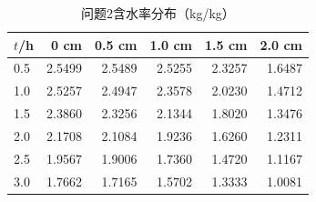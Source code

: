 \begin{table}[!htbp]\centering
\caption{问题2含水率分布（kg/kg）}
\begin{tabular}{lrrrrr}\toprule
$t$/h & 0 cm & 0.5 cm & 1.0 cm & 1.5 cm & 2.0 cm\\\midrule
0.5 & 2.5499 & 2.5489 & 2.5255 & 2.3257 & 1.6487\\
1.0 & 2.5257 & 2.4947 & 2.3578 & 2.0230 & 1.4712\\
1.5 & 2.3860 & 2.3256 & 2.1344 & 1.8020 & 1.3476\\
2.0 & 2.1708 & 2.1084 & 1.9236 & 1.6260 & 1.2311\\
2.5 & 1.9567 & 1.9006 & 1.7360 & 1.4720 & 1.1167\\
3.0 & 1.7662 & 1.7165 & 1.5702 & 1.3333 & 1.0081\\
\bottomrule\end{tabular}\end{table}
